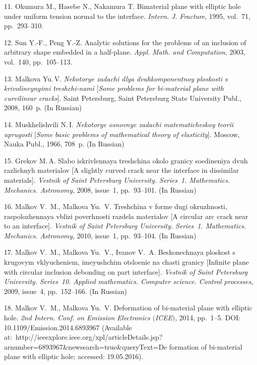 {11. Okumura M., Hasebe N., Nakamura T. Bimaterial plane with
elliptic hole under uniform tension normal to the interface. {\it
Intern. J. Fracture}, 1995, vol.~71,  pp.~293--310.

12. Sun Y.-F., Peng Y.-Z. Analytic solutions for the problems of
an inclusion of arbitrary shape embedded in a half-plane. {\it
Appl. Math. and Computation}, 2003, vol.~140, pp.~105--113.

13. Malkova Yu.\,V. {\it Nekotorye zadachi dlya dvuhkomponentnoy
ploskosti s krivolineynyimi treshchi-\linebreak nami} [{\it Some
problems for bi-material plane with curvilinear cracks}]. Saint
Petersburg, Saint Petersburg State University Publ., 2008, 160~p.
(In Russian)

14. Muskhelishvili N.\,I. {\it Nekotorye osnovnye zadachi
matematicheskoy teorii uprugosti} [{\it Some basic problems of
mathematical theory of elasticity}]. Moscow,  Nauka Publ., 1966,
708~p. (In Russian)

15. Grekov M.\,A. Slabo iskrivlennaya treshchina okolo granicy
soedineniya dvuh razlichnyh materialov [A slightly curved crack
near the interface in dissimilar materials]. {\it Vestnik of Saint
Petersburg University. Series~1. Mathematics. Mechanics.
Astronomy}, 2008, issue~1, pp.~93--101. (In Russian)

16. Malkov V.~M.,  Malkova Yu.~V. Treshchina v forme dugi
okruzhnosti, raspolozhennaya vblizi poverhnosti razdela materialov
[A circular arc crack near to an interface]. {\it Vestnik of Saint
Petersburg University. Series~1. Mathematics. Mechanics.
Astronomy},  2010, issue~1, pp.~93--104. (In Russian)

17.  Malkov V.~M.,  Malkova Yu.~V., Ivanov V.~A. Beskonechnaya
ploskost s krugovym vklyucheniem, imeyushchim otsloenie na chasti
granicy [Infinite plane with circular inclusion debonding on part
interface]. {\it Vestnik of Saint Petersburg University.
Series~10.  Applied mathematics. Computer science. Control
processes}, 2009, issue~4, pp.~152--166. (In Russian)

18. Malkov V.~M.,  Malkova Yu.~V. Deformation of bi-material plane
with elliptic hole. {\it 2nd Intern. Conf. on Emission Electronics
$($ICEE$)$}, 2014,  pp.~1--5. DOI: 10.1109/Emission.2014.6893967
(Available
at:~http://ieeexplore.ieee.org/xpl/articleDetails.jsp?arnumber=6893967\&newsearch=true\&queryText=De\linebreak
\noindent formation of bi-material plane with elliptic hole;
accessed: 19.05.2016).

}
